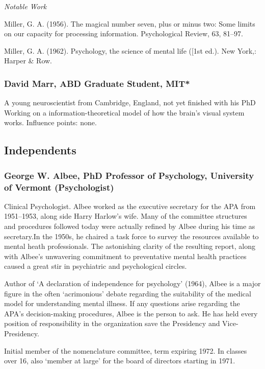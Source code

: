\emph{Notable Work}

Miller, G. A. (1956). The magical number seven, plus or minus two: Some limits on our capacity for processing information. Psychological Review, 63, 81--97.

Miller, G. A. (1962). Psychology, the science of mental life ([1st ed.). New York,: Harper \& Row.

\subsubsection{David Marr, ABD Graduate Student, MIT*}
\label{davidmarrabdgraduatestudentmit}

A young neuroscientist from Cambridge, England, not yet finished with his PhD Working on a information-theoretical model of how the brain's visual system works.
Influence points: none.

\subsection{Independents}
\label{independents}

\subsubsection{George W. Albee, PhD Professor of Psychology, University of Vermont (Psychologist)}
\label{georgew.albeephdprofessorofpsychologyuniversityofvermontpsychologist}

Clinical Psychologist. Albee worked as the executive secretary for the APA from 1951--1953, along side Harry Harlow's wife. Many of the committee structures and procedures followed today were actually refined by Albee during his time as secretary.In the 1950s, he chaired a task force to survey the resources available to mental heath professionals. The astonishing clarity of the resulting report, along with Albee's unwavering commitment to preventative mental health practices caused a great stir in psychiatric and psychological circles.

Author of `A declaration of independence for psychology' (1964), Albee is a major figure in the often `acrimonious' debate regarding the suitability of the medical model for understanding mental illness. If any questions arise regarding the APA's decision-making procedures, Albee is the person to ask. He has held every position of responsibility in the organization save the Presidency and Vice-Presidency.

Initial member of the nomenclature committee, term expiring 1972. In classes over 16, also `member at large' for the board of directors starting in 1971.


